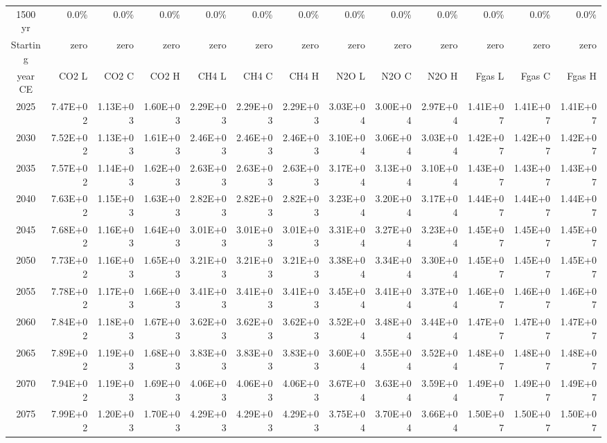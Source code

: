 \documentclass{article}
\begin{document}
\begin{table}
\begin{tabular}{crrr|rrr|rrr|rrr}
1500 yr  & 0.0\%     & 0.0\%     & 0.0\%     & 0.0\%     & 0.0\%     & 0.0\%     & 0.0\%     & 0.0\%     & 0.0\%     & 0.0\%     & 0.0\%     & 0.0\%     \\
Starting & zero      & zero      & zero      & zero      & zero      & zero      & zero      & zero      & zero      & zero      & zero      & zero      \\
year CE  & CO2 L     & CO2 C     & CO2 H     & CH4 L     & CH4 C     & CH4 H     & N2O L     & N2O C     & N2O H     & Fgas L    & Fgas C    & Fgas H    \\
2025     & 7.47E+02  & 1.13E+03  & 1.60E+03  & 2.29E+03  & 2.29E+03  & 2.29E+03  & 3.03E+04  & 3.00E+04  & 2.97E+04  & 1.41E+07  & 1.41E+07  & 1.41E+07  \\
2030     & 7.52E+02  & 1.13E+03  & 1.61E+03  & 2.46E+03  & 2.46E+03  & 2.46E+03  & 3.10E+04  & 3.06E+04  & 3.03E+04  & 1.42E+07  & 1.42E+07  & 1.42E+07  \\
2035     & 7.57E+02  & 1.14E+03  & 1.62E+03  & 2.63E+03  & 2.63E+03  & 2.63E+03  & 3.17E+04  & 3.13E+04  & 3.10E+04  & 1.43E+07  & 1.43E+07  & 1.43E+07  \\
2040     & 7.63E+02  & 1.15E+03  & 1.63E+03  & 2.82E+03  & 2.82E+03  & 2.82E+03  & 3.23E+04  & 3.20E+04  & 3.17E+04  & 1.44E+07  & 1.44E+07  & 1.44E+07  \\
2045     & 7.68E+02  & 1.16E+03  & 1.64E+03  & 3.01E+03  & 3.01E+03  & 3.01E+03  & 3.31E+04  & 3.27E+04  & 3.23E+04  & 1.45E+07  & 1.45E+07  & 1.45E+07  \\
2050     & 7.73E+02  & 1.16E+03  & 1.65E+03  & 3.21E+03  & 3.21E+03  & 3.21E+03  & 3.38E+04  & 3.34E+04  & 3.30E+04  & 1.45E+07  & 1.45E+07  & 1.45E+07  \\
2055     & 7.78E+02  & 1.17E+03  & 1.66E+03  & 3.41E+03  & 3.41E+03  & 3.41E+03  & 3.45E+04  & 3.41E+04  & 3.37E+04  & 1.46E+07  & 1.46E+07  & 1.46E+07  \\
2060     & 7.84E+02  & 1.18E+03  & 1.67E+03  & 3.62E+03  & 3.62E+03  & 3.62E+03  & 3.52E+04  & 3.48E+04  & 3.44E+04  & 1.47E+07  & 1.47E+07  & 1.47E+07  \\
2065     & 7.89E+02  & 1.19E+03  & 1.68E+03  & 3.83E+03  & 3.83E+03  & 3.83E+03  & 3.60E+04  & 3.55E+04  & 3.52E+04  & 1.48E+07  & 1.48E+07  & 1.48E+07  \\
2070     & 7.94E+02  & 1.19E+03  & 1.69E+03  & 4.06E+03  & 4.06E+03  & 4.06E+03  & 3.67E+04  & 3.63E+04  & 3.59E+04  & 1.49E+07  & 1.49E+07  & 1.49E+07  \\
2075     & 7.99E+02  & 1.20E+03  & 1.70E+03  & 4.29E+03  & 4.29E+03  & 4.29E+03  & 3.75E+04  & 3.70E+04  & 3.66E+04  & 1.50E+07  & 1.50E+07  & 1.50E+07  \\

\end{tabular}
\end{table}
\end{document}
